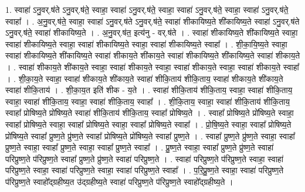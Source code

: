 \documentclass[17pt]{extarticle}
\begin{document}
1. स्वाहा॑ ऽनु॒वर्.ष॑ते ऽनु॒वर्.ष॑ते॒ स्वाहा॒ स्वाहा॑ ऽनु॒वर्.ष॑ते॒ स्वाहा॒ स्वाहा॑ ऽनु॒वर्.ष॑ते॒ स्वाहा॒ स्वाहा॑ ऽनु॒वर्.ष॑ते॒ स्वाहा᳚ । . अ॒नु॒वर्.ष॑ते॒ स्वाहा॒ स्वाहा॑ ऽनु॒वर्.ष॑ते ऽनु॒वर्.ष॑ते॒ स्वाहा॑ शीकायिष्य॒ते शी॑कायिष्य॒ते स्वाहा॑ ऽनु॒वर्.ष॑ते ऽनु॒वर्.ष॑ते॒ स्वाहा॑ शीकायिष्य॒ते । . अ॒नु॒वर्.ष॑त॒ इत्य॑नु - वर्.ष॑ते । . स्वाहा॑ शीकायिष्य॒ते शी॑कायिष्य॒ते स्वाहा॒ स्वाहा॑ शीकायिष्य॒ते स्वाहा॒ स्वाहा॑ शीकायिष्य॒ते स्वाहा॒ स्वाहा॑ शीकायिष्य॒ते स्वाहा᳚ । . शी॒का॒यि॒ष्य॒ते स्वाहा॒ स्वाहा॑ शीकायिष्य॒ते शी॑कायिष्य॒ते स्वाहा॑ शीकाय॒ते शी॑काय॒ते स्वाहा॑ शीकायिष्य॒ते शी॑कायिष्य॒ते स्वाहा॑ शीकाय॒ते । . स्वाहा॑ शीकाय॒ते शी॑काय॒ते स्वाहा॒ स्वाहा॑ शीकाय॒ते स्वाहा॒ स्वाहा॑ शीकाय॒ते स्वाहा॒ स्वाहा॑ शीकाय॒ते स्वाहा᳚ । . शी॒का॒य॒ते स्वाहा॒ स्वाहा॑ शीकाय॒ते शी॑काय॒ते स्वाहा॑ शीकि॒ताय॑ शीकि॒ताय॒ स्वाहा॑ शीकाय॒ते शी॑काय॒ते स्वाहा॑ शीकि॒ताय॑ । . शी॒का॒य॒त इति॑ शीक - य॒ते । . स्वाहा॑ शीकि॒ताय॑ शीकि॒ताय॒ स्वाहा॒ स्वाहा॑ शीकि॒ताय॒ स्वाहा॒ स्वाहा॑ शीकि॒ताय॒ स्वाहा॒ स्वाहा॑ शीकि॒ताय॒ स्वाहा᳚ । . शी॒कि॒ताय॒ स्वाहा॒ स्वाहा॑ शीकि॒ताय॑ शीकि॒ताय॒ स्वाहा᳚ प्रोषिष्य॒ते प्रो॑षिष्य॒ते स्वाहा॑ शीकि॒ताय॑ शीकि॒ताय॒ स्वाहा᳚ प्रोषिष्य॒ते । . स्वाहा᳚ प्रोषिष्य॒ते प्रो॑षिष्य॒ते स्वाहा॒ स्वाहा᳚ प्रोषिष्य॒ते स्वाहा॒ स्वाहा᳚ प्रोषिष्य॒ते स्वाहा॒ स्वाहा᳚ प्रोषिष्य॒ते स्वाहा᳚ । . प्रो॒षि॒ष्य॒ते स्वाहा॒ स्वाहा᳚ प्रोषिष्य॒ते प्रो॑षिष्य॒ते स्वाहा᳚ प्रुष्ण॒ते प्रु॑ष्ण॒ते स्वाहा᳚ प्रोषिष्य॒ते प्रो॑षिष्य॒ते स्वाहा᳚ प्रुष्ण॒ते । . स्वाहा᳚ प्रुष्ण॒ते प्रु॑ष्ण॒ते स्वाहा॒ स्वाहा᳚ प्रुष्ण॒ते स्वाहा॒ स्वाहा᳚ प्रुष्ण॒ते स्वाहा॒ स्वाहा᳚ प्रुष्ण॒ते स्वाहा᳚ । . प्रु॒ष्ण॒ते स्वाहा॒ स्वाहा᳚ प्रुष्ण॒ते प्रु॑ष्ण॒ते स्वाहा॑ परिप्रुष्ण॒ते प॑रिप्रुष्ण॒ते स्वाहा᳚ प्रुष्ण॒ते प्रु॑ष्ण॒ते स्वाहा॑ परिप्रुष्ण॒ते । . स्वाहा॑ परिप्रुष्ण॒ते प॑रिप्रुष्ण॒ते स्वाहा॒ स्वाहा॑ परिप्रुष्ण॒ते स्वाहा॒ स्वाहा॑ परिप्रुष्ण॒ते स्वाहा॒ स्वाहा॑ परिप्रुष्ण॒ते स्वाहा᳚ । . प॒रि॒प्रु॒ष्ण॒ते स्वाहा॒ स्वाहा॑ परिप्रुष्ण॒ते प॑रिप्रुष्ण॒ते स्वाहो᳚द्ग्रहीष्य॒त उ॑द्ग्रहीष्य॒ते स्वाहा॑ परिप्रुष्ण॒ते प॑रिप्रुष्ण॒ते स्वाहो᳚द्ग्रहीष्य॒ते । \newline
\end{document}
